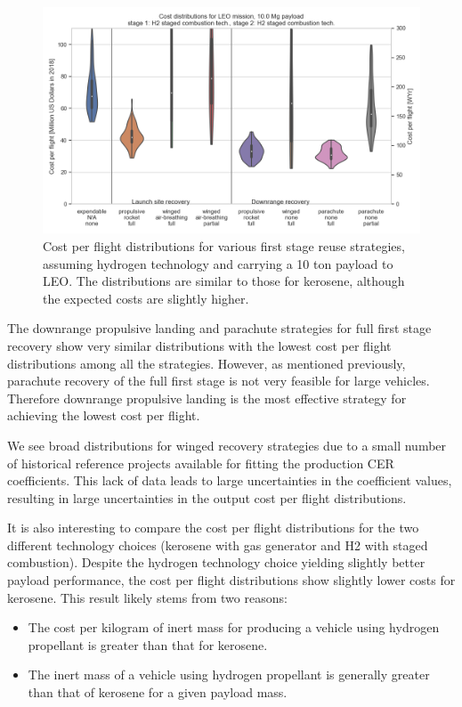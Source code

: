 \documentclass[conf]{new-aiaa}
\begin{document}
\begin{multicols}{2}
\begin{figure}
    \centering
    \includegraphics[width=\textwidth]{../../lvreuse/analysis/combined/plots/strategy_cost_LEO_H2_pld10000}
    \caption{\label{fig:strategy_cost_LEO_H2_pld10000} Cost per flight distributions for various first stage reuse strategies, assuming hydrogen technology and carrying a 10 ton payload to LEO. The distributions are similar to those for kerosene, although the expected costs are slightly higher.}
\end{figure}

The downrange propulsive landing and parachute strategies for full first stage recovery show very similar distributions with the lowest cost per flight distributions among all the strategies. However, as mentioned previously, parachute recovery of the full first stage is not very feasible for large vehicles. Therefore downrange propulsive landing is the most effective strategy for achieving the lowest cost per flight. 

We see broad distributions for winged recovery strategies due to a small number of historical reference projects available for fitting the production CER coefficients. This lack of data leads to large uncertainties in the coefficient values, resulting in large uncertainties in the output cost per flight distributions. 

It is also interesting to compare the cost per flight distributions for the two different technology choices (kerosene with gas generator and H2 with staged combustion). Despite the hydrogen technology choice yielding slightly better payload performance, the cost per flight distributions show slightly lower costs for kerosene. This result likely stems from two reasons:

\begin{itemize}
  \item The cost per kilogram of inert mass for producing a vehicle using hydrogen propellant is greater than that for kerosene. 
  \item The inert mass of a vehicle using hydrogen propellant is generally greater than that of kerosene for a given payload mass.
\end{itemize}


\end{multicols}
\end{document}

